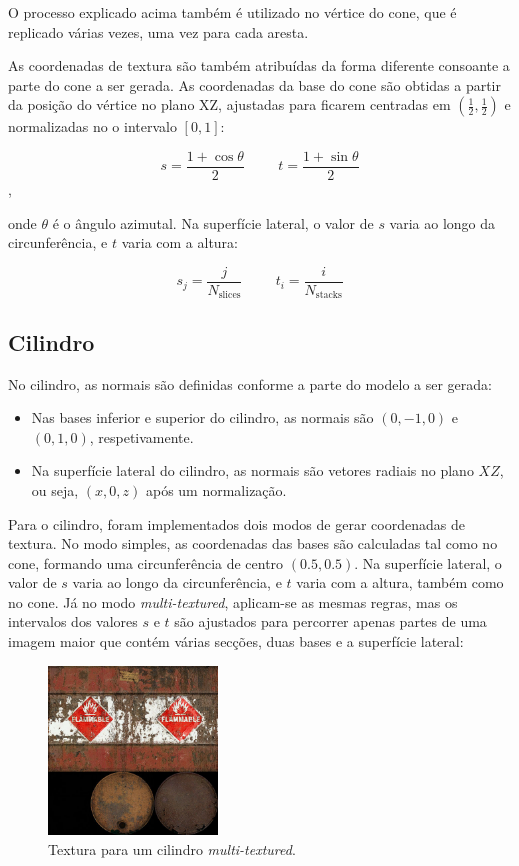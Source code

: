 \documentclass[12pt, a4paper]{article}
\begin{document}
O processo explicado acima também é utilizado no vértice do cone, que é replicado várias vezes, uma
vez para cada aresta.

As coordenadas de textura são também atribuídas da forma diferente consoante a parte do cone a ser
gerada. As coordenadas da base do cone são obtidas a partir da posição do vértice no plano XZ,
ajustadas para ficarem centradas em $(\frac{1}{2}, \frac{1}{2})$ e normalizadas no o intervalo
$[0, 1]$:

$$
s = \frac{1 + \cos \theta}{2}
\hspace{1cm}
t = \frac{1 + \sin \theta}{2}
$$,

onde $\theta$ é o ângulo azimutal. Na superfície lateral, o valor de $s$ varia ao longo da
circunferência, e $t$ varia com a altura:

$$
s_j = \frac{j}{N_\text{slices}}
\hspace{1cm}
t_i = \frac{i}{N_\text{stacks}}
$$

\subsection{Cilindro}

No cilindro, as normais são definidas conforme a parte do modelo a ser gerada:

\begin{itemize}
    \item Nas bases inferior e superior do cilindro, as normais são $(0, -1, 0)$ e $(0, 1, 0)$,
        respetivamente.

    \item Na superfície lateral do cilindro, as normais são vetores radiais no plano $XZ$, ou seja,
        $(x, 0, z)$ após um normalização.
\end{itemize}

Para o cilindro, foram implementados dois modos de gerar coordenadas de textura. No modo simples, as
coordenadas das bases são calculadas tal como no cone, formando uma circunferência de centro
$(0.5, 0.5)$. Na superfície lateral, o valor de $s$ varia ao longo da circunferência, e $t$ varia
com a altura, também como no cone. Já no modo \emph{multi-textured}, aplicam-se as mesmas regras,
mas os intervalos dos valores $s$ e $t$ são ajustados para percorrer apenas partes de uma imagem
maior que contém várias secções, duas bases e a superfície lateral:

\begin{figure}[H]
    \centering
    \includegraphics[width=0.4\textwidth]{res/phase4/Barrel.jpg}
    \caption{Textura para um cilindro \emph{multi-textured}.}
\end{figure}
\end{document}
